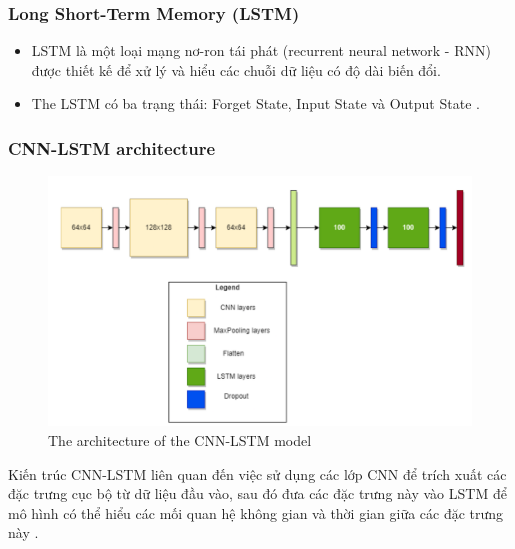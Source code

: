 \documentclass[conference]{IEEEtran}
\begin{document}
\subsubsection{Long Short-Term Memory (LSTM)}
\begin{itemize}
    \item LSTM là một loại mạng nơ-ron tái phát (recurrent neural network - RNN) được thiết kế để xử lý và hiểu các chuỗi dữ liệu có độ dài biến đổi.
    \item The LSTM có ba trạng thái: Forget State, Input State và Output State \cite{ComparasionCNNLSTM}.
\end{itemize}

\subsubsection{CNN-LSTM architecture}
\begin{figure}[H]
    \centering
    \begin{minipage}{0.8\linewidth}
    \centering
        \includegraphics[width=\linewidth]{images/CNNLSTM_Architechture.png}
    \caption{The architecture of the CNN-LSTM model}
    \label{fig10}
    \end{minipage}
\end{figure}
Kiến trúc CNN-LSTM liên quan đến việc sử dụng các lớp CNN để trích xuất các đặc trưng cục bộ từ dữ liệu đầu vào, sau đó đưa các đặc trưng này vào LSTM để mô hình có thể hiểu các mối quan hệ không gian và thời gian giữa các đặc trưng này \cite{PredictStockCNNLSTM}.
\end{document}
